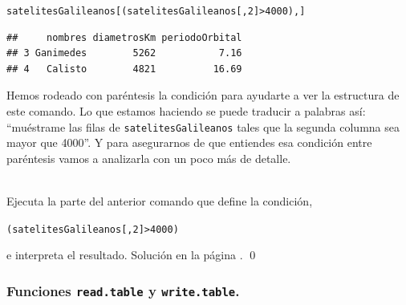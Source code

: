 \documentclass[10pt,a4paper]{article}\usepackage[]{graphicx}\usepackage[]{color}
\makeatletter
\newcommand{\hlnum}[1]{\textcolor[rgb]{0.686,0.059,0.569}{#1}}%
\newcommand{\hlopt}[1]{\textcolor[rgb]{0,0,0}{#1}}%
\newcommand{\hlstd}[1]{\textcolor[rgb]{0.345,0.345,0.345}{#1}}%
\newenvironment{kframe}{%
 \def\at@end@of@kframe{}%
 \ifinner\ifhmode%
  \def\at@end@of@kframe{\end{minipage}}%
  \begin{minipage}{\columnwidth}%
 \fi\fi%
 \def\FrameCommand##1{\hskip\@totalleftmargin \hskip-\fboxsep
 \colorbox{shadecolor}{##1}\hskip-\fboxsep
     \hskip-\linewidth \hskip-\@totalleftmargin \hskip\columnwidth}%
 \MakeFramed {\advance\hsize-\width
   \@totalleftmargin\z@ \linewidth\hsize
   \@setminipage}}%
 {\par\unskip\endMakeFramed%
 \at@end@of@kframe}
\newenvironment{knitrout}{}{} %
\makeatother
\begin{document}
\begin{knitrout}
\color{fgcolor}\begin{kframe}
\begin{alltt}
\hlstd{satelitesGalileanos[ (satelitesGalileanos[ ,}\hlnum{2}\hlstd{]} \hlopt{>} \hlnum{4000}\hlstd{) , ]}
\end{alltt}
\begin{verbatim}
##     nombres diametrosKm periodoOrbital
## 3 Ganimedes        5262           7.16
## 4   Calisto        4821          16.69
\end{verbatim}
\end{kframe}
\end{knitrout}
Hemos rodeado con paréntesis la condición para ayudarte a ver la estructura de este comando. Lo que estamos haciendo se puede traducir a palabras así: ``muéstrame las filas de {\tt satelitesGalileanos} tales que la segunda columna sea mayor que 4000''. Y para asegurarnos de que entiendes esa condición entre paréntesis vamos a analizarla con un poco más de detalle.

\begin{ejercicio}
\label{tut04:ejercicio04}
\quad\\
Ejecuta la parte del anterior comando que define la condición,
\begin{knitrout}
\color{fgcolor}\begin{kframe}
\begin{alltt}
\hlstd{(satelitesGalileanos[ ,}\hlnum{2}\hlstd{]} \hlopt{>} \hlnum{4000}\hlstd{)}
\end{alltt}
\end{kframe}
\end{knitrout}
e interpreta el resultado. Solución en la página \pageref{tut04:ejercicio04:sol}.
\qed
\end{ejercicio}



\subsubsection{Funciones {\tt read.table} y {\tt write.table}.}
\label{tut04:subsubsec:FuncionesReadWriteTable}
\end{document}
